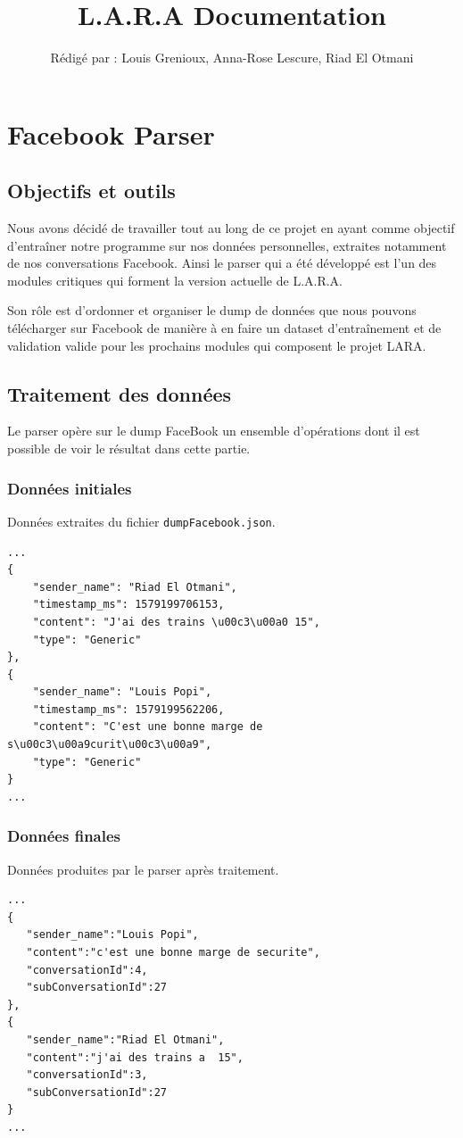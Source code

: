 \documentclass[10pt,a4paper]{article}
\title{L.A.R.A Documentation}
\author{Rédigé par : Louis Grenioux, Anna-Rose Lescure, Riad El Otmani}
\begin{document}
\maketitle
\tableofcontents

\newpage

\section{Facebook Parser}
\subsection{Objectifs et outils}
Nous avons décidé de travailler tout au long de ce projet en ayant comme objectif d'entraîner notre programme sur nos données personnelles, extraites notamment de nos conversations Facebook. Ainsi le parser qui a été développé est l'un des modules critiques qui forment la version actuelle de L.A.R.A.

Son rôle est d'ordonner et organiser le dump de données que nous pouvons télécharger sur Facebook de manière à en faire un dataset d'entraînement et de validation valide pour les prochains modules qui composent le projet LARA.

\subsection{Traitement des données}
Le parser opère sur le dump FaceBook un ensemble d'opérations dont il est possible de voir le résultat dans cette partie.

\subsubsection{Données initiales}
Données extraites du fichier \texttt{dumpFacebook.json}.
\begin{verbatim}
...
{
    "sender_name": "Riad El Otmani",
    "timestamp_ms": 1579199706153,
    "content": "J'ai des trains \u00c3\u00a0 15",
    "type": "Generic"
},
{
    "sender_name": "Louis Popi",
    "timestamp_ms": 1579199562206,
    "content": "C'est une bonne marge de s\u00c3\u00a9curit\u00c3\u00a9",
    "type": "Generic"
}
...
\end{verbatim}

\subsubsection{Données finales}
Données produites par le parser après traitement.
\begin{verbatim}
...
{
   "sender_name":"Louis Popi",
   "content":"c'est une bonne marge de securite",
   "conversationId":4,
   "subConversationId":27
},
{
   "sender_name":"Riad El Otmani",
   "content":"j'ai des trains a  15",
   "conversationId":3,
   "subConversationId":27
}
...
\end{verbatim}
\end{document}
